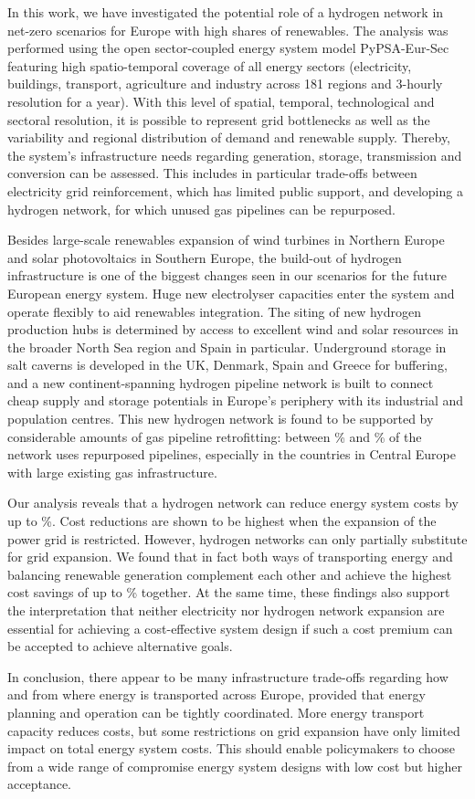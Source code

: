 In this work, we have investigated the potential role of a hydrogen network in
net-zero \co scenarios for Europe with high shares of renewables. The analysis
was performed using the open sector-coupled energy system model PyPSA-Eur-Sec
featuring high spatio-temporal coverage of all energy sectors (electricity,
buildings, transport, agriculture and industry across 181 regions and 3-hourly
resolution for a year). With this level of spatial, temporal, technological and
sectoral resolution, it is possible to represent grid bottlenecks as well as the
variability and regional distribution of demand and renewable supply. Thereby,
the system's infrastructure needs regarding generation, storage, transmission
and conversion can be assessed. This includes in particular trade-offs between
electricity grid reinforcement, which has limited public support, and developing
a hydrogen network, for which unused gas pipelines can be
repurposed.

Besides large-scale renewables expansion of wind turbines in Northern Europe and
solar photovoltaics in Southern Europe, the build-out of hydrogen infrastructure
is one of the biggest changes seen in our scenarios for the future European
energy system. Huge new electrolyser capacities enter the system and operate
flexibly to aid renewables integration. The siting of new hydrogen production
hubs is determined by access to excellent wind and solar resources in the
broader North Sea region and Spain in particular. Underground
storage in salt caverns is developed in the UK, Denmark, Spain and Greece for
buffering, and a new continent-spanning hydrogen pipeline network is built to
connect cheap supply and storage potentials in Europe's periphery with its
industrial and population centres. This new hydrogen network is found to be
supported by considerable amounts of gas pipeline retrofitting: between
\minretroshare\% and \maxretroshare\% of the network uses repurposed pipelines,
especially in the countries in Central Europe with large existing gas
infrastructure.

Our analysis reveals that a hydrogen network can reduce energy system costs by
up to \maxhybenefitrel\%. Cost reductions are shown to be highest when the
expansion of the power grid is restricted. However, hydrogen networks can only
partially substitute for grid expansion. We found that in fact both ways of
transporting energy and balancing renewable generation complement each other and
achieve the highest cost savings of up to \gridbenefitrel\% together. At the
same time, these findings also support the interpretation that neither
electricity nor hydrogen network expansion are essential for achieving a
cost-effective system design if such a cost premium can be accepted to achieve
alternative goals.

In conclusion, there appear to be many infrastructure trade-offs regarding how
and from where energy is transported across Europe, provided that energy
planning and operation can be tightly coordinated. More energy transport
capacity reduces costs, but some restrictions on grid expansion have only
limited impact on total energy system costs. This should enable policymakers to
choose from a wide range of compromise energy system designs with low cost but
higher acceptance.
